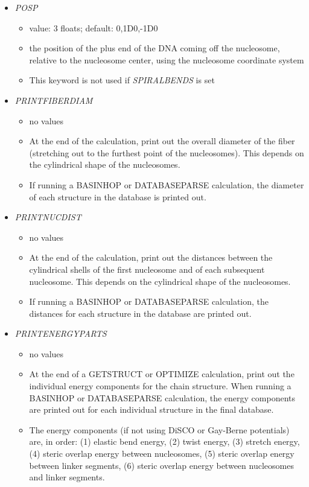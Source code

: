 \documentclass[12pt,dvips]{article}
\begin{document}
\begin{itemize}
%
\item {\it POSP}
  \begin{itemize}
    \item value: 3 floats; default: 0,1D0,-1D0
    \item the position of the plus end of the DNA coming off the nucleosome, relative to the nucleosome center, using the nucleosome coordinate system
    \item This keyword is not used if {\em SPIRALBENDS} is set
  \end{itemize}
%
\item {\it PRINTFIBERDIAM}
  \begin{itemize}
    \item no values
    \item At the end of the calculation, print out the overall diameter of the fiber (stretching out to the furthest point of the nucleosomes). This depends on the cylindrical shape of the nucleosomes.
    \item If running a BASINHOP or DATABASEPARSE calculation, the diameter of each structure in the database is printed out.
  \end{itemize}
%
\item {\it PRINTNUCDIST}
  \begin{itemize}
    \item no values
    \item At the end of the calculation, print out the distances between the cylindrical shells of the first nucleosome and of each subsequent nucleosome. This depends on the cylindrical shape of the nucleosomes.
    \item If running a BASINHOP or DATABASEPARSE calculation, the distances for each structure in the database are printed out.
  \end{itemize}
%
\item {\it PRINTENERGYPARTS}
  \begin{itemize}
    \item no values
    \item At the end of a GETSTRUCT or OPTIMIZE calculation, print out the individual energy components for the chain structure. When running a BASINHOP or DATABASEPARSE calculation, the energy components are printed out for each individual structure in the final database.
    \item The energy components (if not using DiSCO or Gay-Berne potentials) are, in order: (1) elastic bend energy, (2) twist energy, (3) stretch energy, (4) steric overlap energy between nucleosomes, (5) steric overlap energy between linker segments, (6) steric overlap energy between nucleosomes and linker segments. 

\end{itemize}
\end{itemize}
\end{document}

